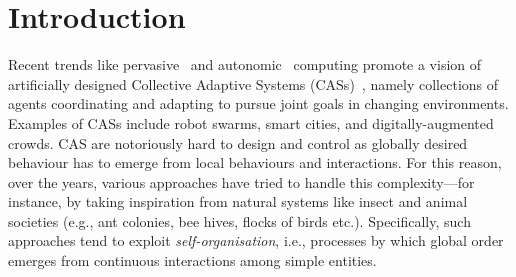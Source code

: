 \documentclass[conference]{IEEEtran}
\begin{document}
\section{Introduction}
Recent trends like pervasive~\cite{DBLP:journals/wc/Satyanarayanan01} and autonomic~\cite{DBLP:journals/computer/KephartC03} computing 
 promote a vision of artificially designed Collective Adaptive Systems (CASs)~\cite{DBLP:conf/huc/Ferscha15},
 namely collections of agents coordinating and adapting %
 to pursue joint goals in changing environments.
 Examples of CASs include robot swarms, smart cities, and digitally-augmented crowds.
%
%
CAS are notoriously hard to design and control 
 as globally desired behaviour
 has to emerge from local behaviours and interactions. 
%
For this reason, over the years, various approaches have tried to handle this complexity---for instance, by taking inspiration from natural systems like insect and animal societies (e.g., ant colonies, bee hives, flocks of birds etc.). 
%
%
Specifically, such approaches tend to exploit 
 \emph{self-organisation}, 
 i.e., processes by which global order emerges 
 from continuous interactions among simple entities.
\end{document}
